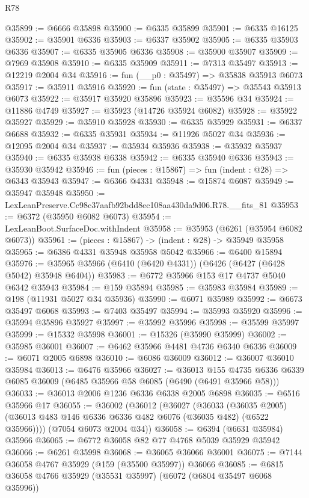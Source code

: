 \begin{lexlean}{R78}
\begin{coremodule}
@35899 := @6666 @35898
@35900 := @6335 @35899
@35901 := @6335 @16125
@35902 := @35901 @6336
@35903 := @6337 @35902
@35905 := @6335 @35903 @6336
@35907 := @6335 @35905 @6336
@35908 := @35900 @35907
@35909 := @7969 @35908
@35910 := @6335 @35909
@35911 := @7313 @35497
@35913 := @12219 @2004 @34
@35916 := fun (__p0 : @35497) => @35838 @35913 @6073
@35917 := @35911 @35916
@35920 := fun (state : @35497) => @35543 @35913 @6073
@35922 := @35917 @35920 @35896
@35923 := @35596 @34
@35924 := @11886 @4749
@35927 := @35923 (@14726 @35924 @6082)
@35928 := @35922 @35927
@35929 := @35910 @35928
@35930 := @6335 @35929
@35931 := @6337 @6688
@35932 := @6335 @35931
@35934 := @11926 @5027 @34
@35936 := @12095 @2004 @34
@35937 := @35934 @35936
@35938 := @35932 @35937
@35940 := @6335 @35938 @6338
@35942 := @6335 @35940 @6336
@35943 := @35930 @35942
@35946 := fun (pieces : @15867) => fun (indent : @28) => @6343 @35943
@35947 := @6366 @4331
@35948 := @15874 @6087
@35949 := @35947 @35948
@35950 := LexLeanPreserve.Cc98c37aafb92bdd8ec108aa430da9d06.R78.__fits_81
@35953 := @6372 (@35950 @6082 @6073)
@35954 := LexLeanBoot.SurfaceDoc.withIndent
@35958 := @35953 (@6261 (@35954 @6082 @6073))
@35961 := (pieces : @15867) -> (indent : @28) -> @35949 @35958
@35965 := @6386 @4331 @35948 @35958 @5042
@35966 := @6400 @15894
@35976 := @35965 @35966 (@6410 (@6420 @4331)) (@6426 (@6427 (@6428 @5042) @35948 @6404))
@35983 := @6772 @35966 @153 @17 @4737 @5040 @6342 @35943
@35984 := @159 @35894
@35985 := @35983 @35984
@35989 := @198 (@11931 @5027 @34 @35936)
@35990 := @6071 @35989
@35992 := @6673 @35497 @6068
@35993 := @7403 @35497
@35994 := @35993 @35920
@35996 := @35994 @35896 @35927
@35997 := @35992 @35996
@35998 := @35599 @35997
@35999 := @15332 @35998
@36001 := @15326 (@35990 @35999)
@36002 := @35985 @36001
@36007 := @6462 @35966 @4481 @4736 @6340 @6336
@36009 := @6071 @2005 @6898
@36010 := @6086 @36009
@36012 := @36007 @36010 @35984
@36013 := @6476 @35966
@36027 := @36013
    @155
    @4735
    @6336
    @6339
    @6085
    @36009
    (@6485 @35966 @58 @6085 (@6490 (@6491 @35966 @58)))
@36033 := @36013 @2006 @1236 @6336 @6338 @2005 @6898
@36035 := @6516 @35966 @17
@36055 := @36002
    (@36012
      (@36027
        (@36033
          (@36035 @2005)
          (@36013 @483 @146 @6336 @6336 @482 @6076 (@36035 @482) (@6522 @35966))))
      (@7054 @6073 @2004 @34))
@36058 := @6394 (@6631 @35984) @35966
@36065 := @6772 @36058 @82 @77 @4768 @5039 @35929 @35942
@36066 := @6261 @35998
@36068 := @36065 @36066 @36001
@36075 := @7144 @36058 @4767 @35929 (@159 (@35500 @35997)) @36066
@36085 := @6815 @36058 @4766 @35929 (@35531 @35997) (@6072 (@6804 @35497 @6068 @35996))

\end{coremodule}
\end{lexlean}
